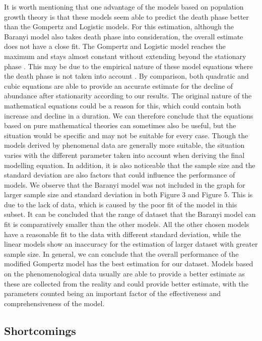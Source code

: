 \documentclass[11pt, oneside]{article}
\begin{document}
	\bigbreak
	\noindent It is worth mentioning that one advantage of the models based on population growth theory is that these models seem able to predict the death phase better than the Gompertz and Logistic models. For this estimation, although the Baranyi model also takes death phase into consideration, the overall estimate does not have a close fit. The Gompertz and Logistic model reaches the maximum and stays almost constant without extending beyond the stationary phase \cite{whiting}. This may be due to the empirical nature of these model equations where the death phase is not taken into account \cite{Choudhury}. By comparison, both quadratic and cubic equations are able to provide an accurate estimate for the decline of abundance after stationarity according to our results. The original nature of the mathematical equations could be a reason for this, which could contain both increase and decline in a duration. We can therefore conclude that the equations based on pure mathematical theories can sometimes also be useful, but the situation would be specific and may not be suitable for every case. Though the models derived by phenomenal data are generally more suitable, the situation varies with the different parameter taken into account when deriving the final modelling equation. 
	\bigbreak
	\noindent In addition, it is also noticeable that the sample size and the standard deviation are also factors that could influence the performance of models. We observe that the Baranyi model was not included in the graph for larger sample size and standard deviation in both Figure 3 and Figure 5. This is due to the lack of data, which is caused by the poor fit of the model in this subset. It can be concluded that the range of dataset that the Baranyi model can fit is comparatively smaller than the other models. All the other chosen models have a reasonable fit to the data with different standard deviation, while the linear models show an inaccuracy for the estimation of larger dataset with greater sample size. 
	\bigbreak
	\noindent In general, we can conclude that the overall performance of the modified Gompertz model has the best estimation for our dataset. Models based on the phenomenological data usually are able to provide a better estimate as these are collected from the reality and could provide better estimate, with the parameters counted being an important factor of the effectiveness and comprehensiveness of the model. 
	
	\subsection{Shortcomings}
	
\end{document}
